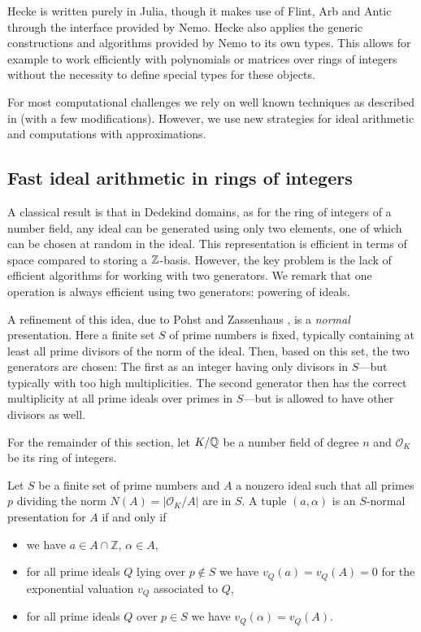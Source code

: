 \documentclass{sig-alternate-05-2015}
\begin{document}
Hecke is written purely in Julia, though it makes use of Flint, Arb and Antic through the interface provided by Nemo.
Hecke also applies the generic constructions and algorithms provided by Nemo to its own types. This allows for example to
work efficiently with polynomials or matrices over rings of integers without the necessity to define special types for these objects.

For most computational challenges we rely on well known techniques as described in \cite{Cohen1993, Pohst1997, Belabas2004}
(with a few modifications). However, we use new strategies for ideal arithmetic and computations with approximations.

\subsection{Fast ideal arithmetic in rings of integers}

A classical result is that in Dedekind domains, as for the ring of integers of a number field, any
ideal can be generated using only two elements, one of which can be chosen
at random in the ideal. This representation is efficient in terms of space compared to storing a
$\mathbb{Z}$-basis. However, the key problem is the lack of
efficient algorithms for working with two generators. We remark that one
operation is always efficient using two generators: powering of ideals.

A refinement of this idea, due to Pohst and Zassenhaus \cite[p. 400]{Pohst1997}, is a 
\textit{normal} presentation. Here a finite set $S$ of prime numbers
is fixed, typically containing at least all prime divisors of the norm of the ideal. Then,
based on this set, the two generators are chosen: The first as an integer
having only divisors in $S$---but typically with too high multiplicities.
The second generator then has the correct multiplicity at all prime ideals
over primes in $S$---but is allowed to have other divisors as well.

For the remainder of this section, let $K/\mathbb{Q}$ be a number field of
degree $n$ and $\mathcal O_K$ be its ring of integers.

\begin{definition}
Let $S$ be a finite set of prime numbers and $A$ a nonzero ideal such that
all primes $p$ dividing the norm $N(A) = |\mathcal O_K/A|$ are in $S$.
A tuple $(a, \alpha)$ is an $S$-normal presentation for $A$ if and only if
\begin{itemize}
\setlength{\itemsep}{1pt}
\setlength{\parskip}{0pt}
\setlength{\parsep}{0pt}
\item we have $a\in A\cap \mathbb Z$, $\alpha\in A$,
\item for all prime ideals $Q$ lying over $p\not\in S$ we have $v_Q(a)= v_Q(A) = 0$
  for the exponential valuation $v_Q$ associated to $Q$,
\item for all prime ideals $Q$ over $p\in S$ we have $v_Q(\alpha) = v_Q(A)$.
\end{itemize}
\end{definition}
\end{document}
